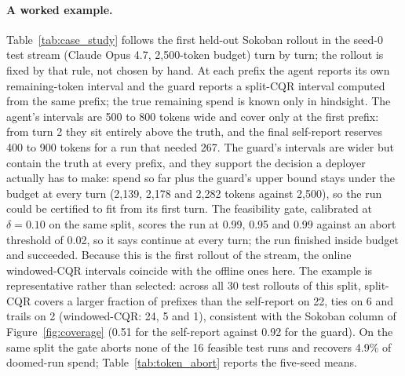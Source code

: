 %

\paragraph{A worked example.}
Table~\ref{tab:case_study} follows the first held-out Sokoban rollout in the seed-0
test stream (Claude Opus 4.7, 2,500-token budget) turn by turn; the rollout is fixed
by that rule, not chosen by hand. At each prefix the agent reports its own
remaining-token interval and the guard reports a split-CQR interval computed from
the same prefix; the true remaining spend is known only in hindsight. The agent's
intervals are 500 to 800 tokens wide and cover only at the first prefix: from turn 2
they sit entirely above the truth, and the final self-report reserves 400 to 900
tokens for a run that needed 267. The guard's intervals are wider but contain the
truth at every prefix, and they support the decision a deployer actually has to make:
spend so far plus the guard's upper bound stays under the budget at every turn
(2,139, 2,178 and 2,282 tokens against 2,500), so the run could be certified to fit
from its first turn. The feasibility gate, calibrated at $\delta{=}0.10$ on the same
split, scores the run at 0.99, 0.95 and 0.99 against an abort threshold of 0.02, so
it says continue at every turn; the run finished inside budget and succeeded.
Because this is the first rollout of the stream, the online windowed-CQR intervals
coincide with the offline ones here. The example is representative rather than selected: across all 30
test rollouts of this split, split-CQR covers a larger fraction of prefixes than the
self-report on 22, ties on 6 and trails on 2 (windowed-CQR: 24, 5 and 1), consistent
with the Sokoban column of Figure~\ref{fig:coverage} (0.51 for the self-report
against 0.92 for the guard). On the same split the gate aborts none of the 16
feasible test runs and recovers 4.9\% of doomed-run spend; Table~\ref{tab:token_abort}
reports the five-seed means.

